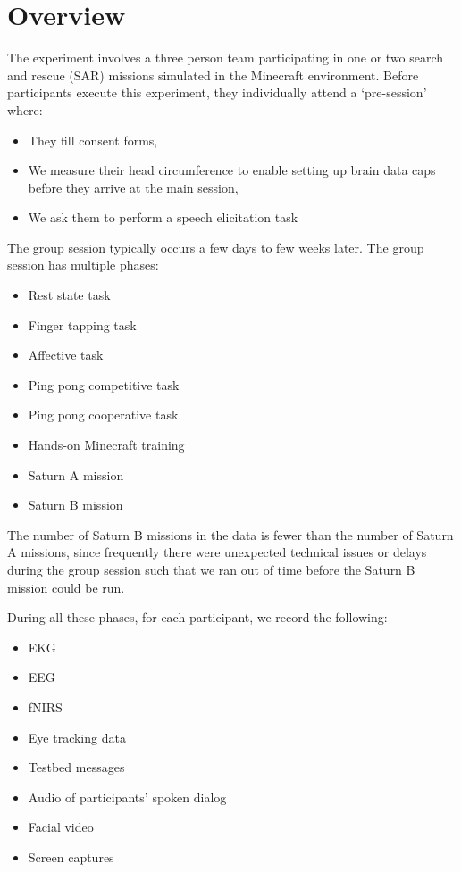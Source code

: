 \section{Overview}

The experiment involves a three person team participating in one or two
search and rescue (SAR) missions simulated in the Minecraft environment.
Before participants execute this experiment, they individually attend a
`pre-session' where:

\begin{itemize}
    \item They fill consent forms,
    \item We measure their head circumference to enable setting up brain data
        caps before they arrive at the main session,
    \item We ask them to perform a speech elicitation task
\end{itemize}
%
The group session typically occurs a few days to few weeks later.
The group session has multiple phases:

\begin{itemize}
    \item Rest state task
    \item Finger tapping task
    \item Affective task
    \item Ping pong competitive task
    \item Ping pong cooperative task
    \item Hands-on Minecraft training
    \item Saturn A mission
    \item Saturn B mission
\end{itemize}

The number of Saturn B missions in the data is fewer than the number of Saturn
A missions, since frequently there were unexpected technical issues or delays
during the group session such that we ran out of time before the Saturn B
mission could be run.

During all these phases, for each participant, we record the following:

\begin{itemize}
    \item EKG
    \item EEG
    \item fNIRS
    \item Eye tracking data
    \item Testbed messages
    \item Audio of participants' spoken dialog
    \item Facial video
    \item Screen captures
\end{itemize}

